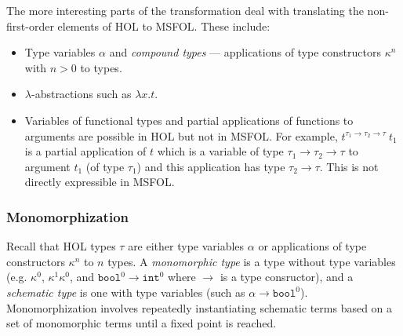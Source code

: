 \documentclass{article}
\begin{document}
	The more interesting parts of the 
	transformation deal with 
	translating the non-first-order
	elements of HOL to MSFOL. These 
	include:
	\begin{itemize}
		\item Type variables $\alpha$
		and \textit{compound types} ---
		applications of type constructors
		$\kappa^n$ with $n > 0$ to 
		types.
		\item $\lambda$-abstractions 
		such as $\lambda x. t$.
		\item Variables of functional 
		types and partial applications 
		of functions to arguments are 
		possible in HOL but not in 
		MSFOL. For example, 
		$t^{\tau_1 \to \tau_2 \to 
			\tau}\ t_1$ is a 
		partial application of $t$ 
		which is a variable of type 
		$\tau_1 \to \tau_2 \to \tau$
		to argument $t_1$ (of type 
		$\tau_1$) and this 
		application has type 
		$\tau_2 \to \tau$.
		This is not directly 
		expressible in MSFOL.
	\end{itemize}
	
	\subsubsection{Monomorphization}
	Recall that HOL types $\tau$ are 
	either type	variables $\alpha$ or 
	applications of type constructors 
	$\kappa^n$ to $n$ types.
	A \textit{monomorphic type} is a
	type without type variables 
	(e.g. $\kappa^0$, $\kappa^1 
	\kappa^0$, and $\texttt{bool}^0 
	\to \texttt{int}^0$ 
	where $\to$ is 
	a type consructor), and 
	a \textit{schematic type} is one 
	with type variables (such as 
	$\alpha \to \texttt{bool}^0$). 
	Monomorphization involves 
	repeatedly instantiating schematic
	terms based on a set of 
	monomorphic terms until a fixed 
	point is reached.
	
\end{document}
